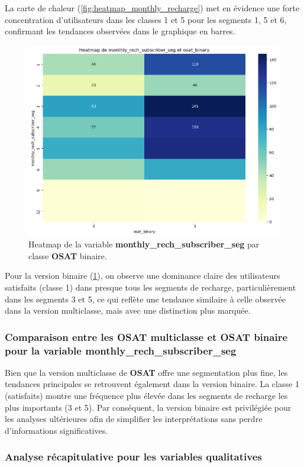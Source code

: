 La carte de chaleur (\ref{fig:heatmap_monthly_recharge}) met en évidence une forte concentration d'utilisateurs dans les classes 1 et 5 pour les segments 1, 5 et 6, confirmant les tendances observées dans le graphique en barres.

\begin{figure}[H]
    \centering
    \includegraphics[width=0.7\linewidth]{heatmap_monthly_recharge_binary.png}
    \caption{Heatmap de la variable \textbf{monthly\_rech\_subscriber\_seg} par classe \textbf{OSAT} binaire.}
    \label{fig:heatmap_monthly_recharge_binary}
\end{figure}

Pour la version binaire (\ref{fig:heatmap_monthly_recharge_binary}), on observe une dominance claire des utilisateurs satisfaits (classe 1) dans presque tous les segments de recharge, particulièrement dans les segments 3 et 5, ce qui reflète une tendance similaire à celle observée dans la version multiclasse, mais avec une distinction plus marquée.

\subsubsection*{Comparaison entre les OSAT multiclasse et OSAT binaire pour la variable \textbf{monthly\_rech\_subscriber\_seg}} 
Bien que la version multiclasse de \textbf{OSAT} offre une segmentation plus fine, les tendances principales se retrouvent également dans la version binaire. La classe 1 (satisfaits) montre une fréquence plus élevée dans les segments de recharge les plus importants (3 et 5). Par conséquent, la version binaire est privilégiée pour les analyses ultérieures afin de simplifier les interprétations sans perdre d'informations significatives.

\subsubsection*{Analyse récapitulative pour les variables qualitatives}

